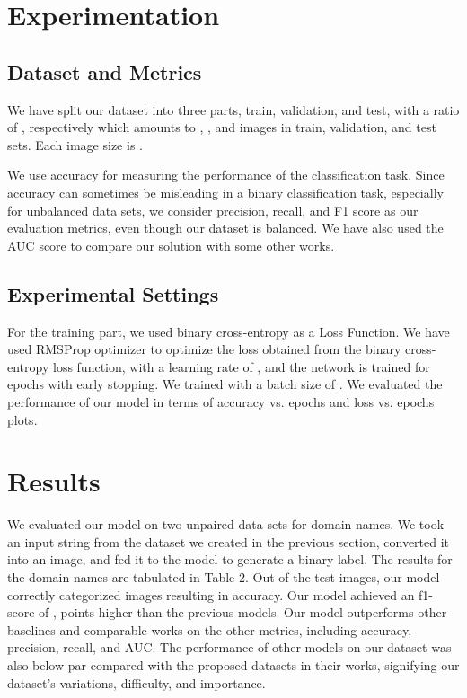 \documentclass[letterpaper]{article} \usepackage{aaai22}  \usepackage{times}  \usepackage{helvet}  \usepackage{courier}  \usepackage[hyphens]{url}  \usepackage{graphicx} \urlstyle{rm} \def\UrlFont{\rm}  \usepackage{natbib}  \usepackage{caption} \DeclareCaptionStyle{ruled}{labelfont=normalfont,labelsep=colon,strut=off} \frenchspacing  \setlength{\pdfpagewidth}{8.5in}  \setlength{\pdfpageheight}{11in}  \usepackage{algorithm}
\begin{document}
\section{Experimentation}

\subsection{Dataset and Metrics}
We have split our dataset into three parts, train, validation, and test, with a ratio of , respectively which amounts to , , and  images in train, validation, and test sets. Each image size is . 

We use accuracy for measuring the performance of the classification task. Since accuracy can sometimes be misleading in a binary classification task, especially for unbalanced data sets, we consider precision, recall, and F1 score as our evaluation metrics, even though our dataset is balanced. We have also used the AUC score to compare our solution with some other works.

\subsection{Experimental Settings}
For the training part, we used binary cross-entropy as a Loss Function. We have used RMSProp optimizer to optimize the loss obtained from the binary cross-entropy loss function, with a learning rate of , and the network is trained for  epochs with early stopping. We trained with a batch size of . We evaluated the performance of our model in terms of accuracy vs. epochs and loss vs. epochs plots.

\section{Results}
We evaluated our model on two unpaired data sets for domain names. We took an input string from the dataset we created in the previous section, converted it into an image, and fed it to the model to generate a binary label. The results for the domain names are tabulated in Table 2. Out of the  test images, our model correctly categorized  images resulting in  accuracy. Our model achieved an f1-score of ,  points higher than the previous models. Our model outperforms other baselines and comparable works on the other metrics, including accuracy, precision, recall, and AUC. The performance of other models on our dataset was also below par compared with the proposed datasets in their works, signifying our dataset's variations, difficulty, and importance. 
\end{document}
